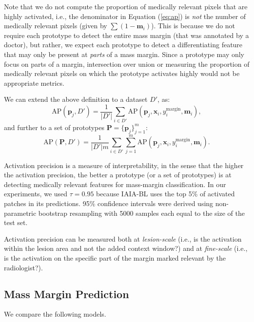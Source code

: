 \documentclass[11pt]{article}
\begin{document}
Note that we do not compute the proportion of medically relevant pixels that are highly activated, i.e., the denominator in Equation (\ref{eq:ap}) is \textit{not} the number of medically relevant pixels (given by $\sum (1 - \mathbf{m}_i)$). This is because we do not require each prototype to detect the entire mass margin (that was annotated by a doctor), but rather, we expect each prototype to detect a differentiating feature that may only be present at \textit{parts} of a mass margin. Since a prototype may only focus on parts of a margin, intersection over union or measuring the proportion of medically relevant pixels on which the prototype activates highly would not be appropriate metrics.

We can extend the above definition to a dataset $D'$, as:
\begin{equation}
    \textrm{AP}(\mathbf{p}_j, D') = \frac{1}{|D'|}\sum_{i \in D'} \textrm{AP}(\mathbf{p}_j, \mathbf{x}_i, y^{\text{margin}}_i, \mathbf{m}_i),
\end{equation}
and further to a set of prototypes $\mathbf{P} = \{\mathbf{p}_j\}_{j=1}^m$:
\begin{equation}
    \textrm{AP}(\mathbf{P}, D') = \frac{1}{|D'|m}\sum_{i \in D'}\sum_{j=1}^m \textrm{AP}(\mathbf{p}_j, \mathbf{x}_i, y^{\text{margin}}_i, \mathbf{m}_i).
\end{equation}

Activation precision is a measure of interpretability, in the sense that the higher the activation precision, the better a prototype (or a set of prototypes) is at detecting medically relevant features for mass-margin classification. In our experiments, we used $\tau = 0.95$ because IAIA-BL uses the top 5\% of activated patches in its predictions. 95\% confidence intervals were derived using non-parametric bootstrap resampling with 5000 samples each equal to the size of the test set.

Activation precision can be measured both at \textit{lesion-scale} (i.e., is the activation within the lesion area and not the added context window?) and at \textit{fine-scale} (i.e., is the activation on the specific part of the margin marked relevant by the radiologist?).

\subsection{Mass Margin Prediction}
\label{sec:results_margin}

We compare the following models.
\end{document}
